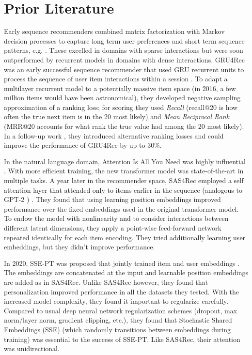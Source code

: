 \documentclass[10pt]{article}
\begin{document}
\section{Prior Literature}

Early sequence recommenders combined matrix factorization with Markov decision processes to capture long term user preferences and short term sequence patterns, e.g. \cite{FPMC}. These excelled in domains with sparse interactions but were soon outperformed by recurrent models in domains with dense interactions. GRU4Rec was an early successful sequence recommender that used GRU recurrent units to process the sequence of user item interactions within a session \cite{GRU4Rec}. To adapt a multilayer recurrent model to a potentially massive item space (in 2016, a few million items would have been astronomical), they developed negative sampling approximation of a ranking loss; for scoring they used \emph{Recall} (recall@20 is how often the true next item is in the 20 most likely) and \emph{Mean Reciprocal Rank} (MRR@20 accounts for what rank the true value had among the 20 most likely). In a follow-up work \cite{GRU4Rec+}, they introduced alternative ranking losses and could improve the performance of GRU4Rec by up to 30\%. 

In the natural language domain, Attention Is All You Need was highly influential \cite{AttentionAll}. With more efficient training, the new transformer model was state-of-the-art in multiple tasks. A year later in the recommender space, SAS4Rec employed a self attention layer that attended only to items earlier in the sequence (analogous to GPT-2 \cite{gpt2}) \cite{SAS4Rec}. They found that using learning position embeddings improved performance over the fixed embeddings used in the original transformer model. To endow the model with nonlinearity and to consider interactions between different latent dimensions, they apply a point-wise feed-forward network repeated identically for each item encoding. They tried additionally learning user embeddings, but they didn't improve performance.

In 2020, SSE-PT was proposed that jointly trained item and user embeddings \cite{SSE-PT}. The embeddings are concatenated at the input and learnable position embeddings are added as in SAS4Rec. Unlike SAS4Rec however, they found that personalization improved performance in all the datasets they tested. With the increased model complexity, they found it important to regularize carefully. Compared to usual deep neural network regularization schemes (dropout, max norm/layer norm, gradient clipping, etc.), they found that Stochastic Shared Embeddings (SSE) \cite{SSE} (which randomly transitions between embeddings during training) was essential to the success of SSE-PT. Like SAS4Rec, their attention was unidirectional.
\end{document}
